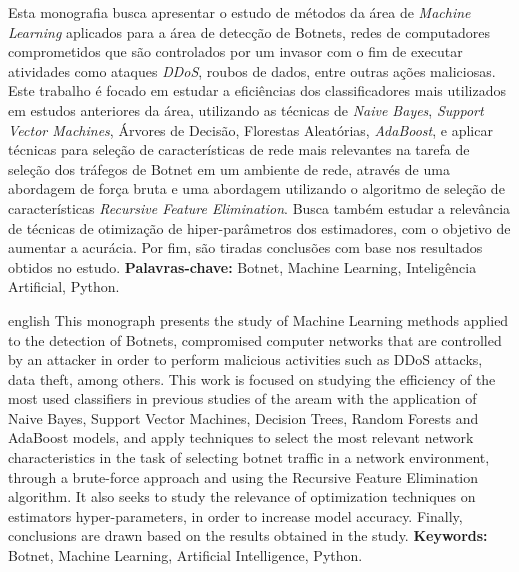 \documentclass[
	12pt,				%
	openright,			%
	oneside,			%
	a4paper,			%
	english,			%
	french,				%
	spanish,			%
	brazil,				%
	]{abntex2}
\begin{document}

\setlength{\absparsep}{18pt} %
\begin{resumo}
Esta monografia busca apresentar o estudo de métodos da área de \textit{Machine Learning} aplicados para a área de detecção de Botnets, redes de computadores comprometidos que são controlados por um invasor com o fim de executar atividades como ataques \textit{DDoS}, roubos de dados, entre outras ações maliciosas. Este trabalho é focado em estudar a eficiências dos classificadores mais utilizados em estudos anteriores da área, utilizando as técnicas de \textit{Naive Bayes}, \textit{Support Vector Machines}, Árvores de Decisão, Florestas Aleatórias, \textit{AdaBoost}, e aplicar técnicas para seleção de características de rede mais relevantes na tarefa de seleção dos tráfegos de Botnet em um ambiente de rede, através de uma abordagem de força bruta e uma abordagem utilizando o algoritmo de seleção de características \textit{Recursive Feature Elimination}. Busca também estudar a relevância de técnicas de otimização de hiper-parâmetros dos estimadores, com o objetivo de aumentar a acurácia. Por fim, são tiradas conclusões com base nos resultados obtidos no estudo. \linebreak
\textbf{Palavras-chave:} Botnet, Machine Learning, Inteligência Artificial, Python.
\end{resumo}

\begin{resumo}[Abstract]
 \begin{otherlanguage*}{english}
This monograph presents the study of Machine Learning methods applied to the detection of Botnets, compromised computer networks that are controlled by an attacker in order to perform malicious activities such as DDoS attacks, data theft, among others. This work is focused on studying the efficiency of the most used classifiers in previous studies of the aream with the application of Naive Bayes, Support Vector Machines, Decision Trees, Random Forests and AdaBoost models, and apply techniques to select the most relevant network characteristics in the task of selecting botnet traffic in a network environment, through a brute-force approach and using the Recursive Feature Elimination algorithm. It also seeks to study the relevance of optimization techniques on estimators hyper-parameters, in order to increase model accuracy. Finally, conclusions are drawn based on the results obtained in the study. \linebreak
\textbf{Keywords:} Botnet, Machine Learning, Artificial Intelligence, Python.
 \end{otherlanguage*}
\end{resumo}
\end{document}
